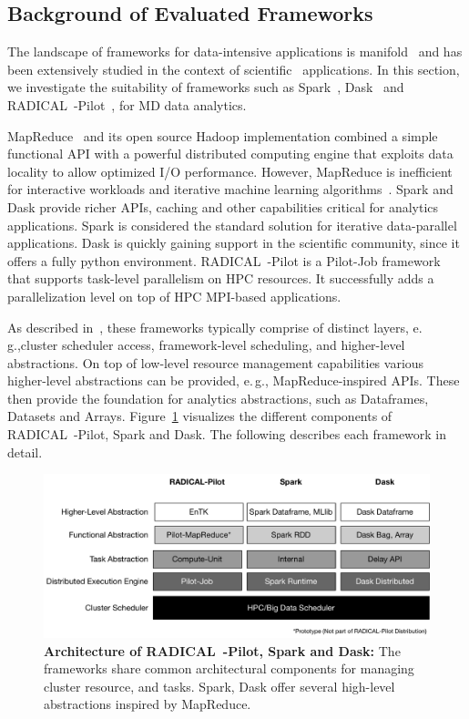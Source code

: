 \subsection{Background of Evaluated Frameworks}
\label{frameworks}
The landscape of frameworks for data-intensive applications is manifold~\cite{jha2014tale,kamburugamuve2017anatomy} and has been extensively studied in the context of scientific~\cite{jha2017introducing} applications.
In this section, we investigate the suitability of frameworks such as Spark~\cite{zaharia2010spark}, Dask~\cite{rocklin2015dask} and RADICAL~-Pilot~\cite{merzky2019using}, for MD data analytics.

MapReduce~\cite{dean2004mapreduce} and its open source Hadoop implementation combined a simple functional API with a powerful distributed computing engine that exploits data locality to allow optimized I/O performance.
However, MapReduce is inefficient for interactive workloads and iterative machine learning algorithms~\cite{zaharia2010spark,ekanayake2010twister}.
Spark and Dask provide richer APIs, caching and other capabilities critical for analytics applications.
Spark is considered the standard solution for iterative data-parallel applications.
Dask is quickly gaining support in the scientific community, since it offers a fully python environment.
RADICAL~-Pilot is a Pilot-Job framework~\cite{luckow2012pstar} that supports task-level parallelism on HPC resources.
It successfully adds a parallelization level on top of HPC MPI-based applications.

As described in~\cite{jha2014tale}, these frameworks typically comprise of distinct layers, e.\,g.,cluster scheduler access, framework-level scheduling, and higher-level abstractions.
On top of low-level resource management capabilities various higher-level abstractions can be provided, e.\,g., MapReduce-inspired APIs.
These then provide the foundation for analytics abstractions, such as Dataframes, Datasets and Arrays.
Figure~\ref{fig:figures_bigdata_framework_stack} visualizes the different components of RADICAL~-Pilot, Spark and Dask.
The following describes each framework in detail.

\begin{figure}[ht]
    \centering
    \includegraphics[width=.95\textwidth]{figures/data_analytics_hpc/task_par/bigdata_framework_stack.pdf}
    \caption{\textbf{Architecture of RADICAL~-Pilot, Spark and Dask:}
    The frameworks share common architectural components for managing cluster resource, and tasks.
    Spark, Dask offer several high-level abstractions inspired by MapReduce.}
    \label{fig:figures_bigdata_framework_stack}
\end{figure}

